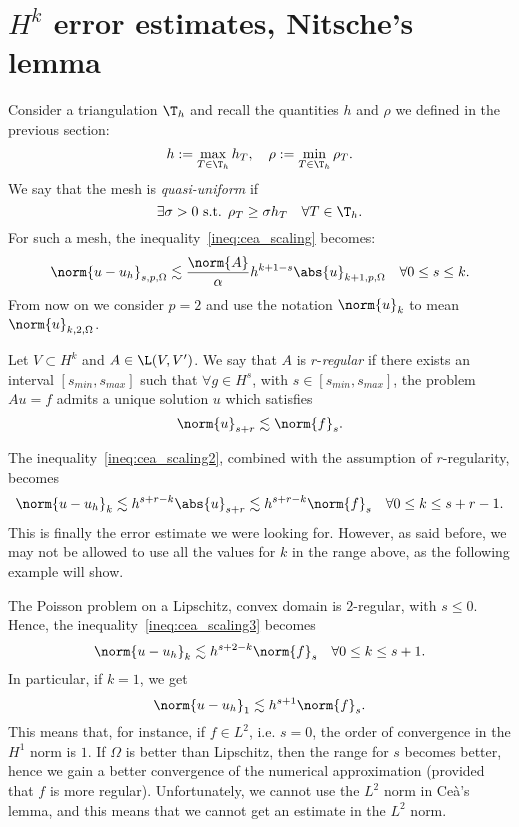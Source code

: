 \section{\texorpdfstring{$H^k$}{Hk} error estimates, Nitsche's lemma}
Consider a triangulation $\T_h$ and recall the quantities $h$ and $\rho$ we defined in the previous section:
\[
h := \max_{T \in \T_h} h_T, \quad \rho := \min_{T \in \T_h} \rho_T.
\]
We say that the mesh is \emph{quasi-uniform} if
\[
\exists \sigma > 0 \text{ s.t. } \rho_T \ge \sigma h_T  \quad \forall T\in \T_h.
\]
For such a mesh, the inequality~\eqref{ineq:cea_scaling} becomes:
\begin{equation} \label{ineq:cea_scaling2}
\norm{u - u_h}_{s,p,\Omega}
\lesssim \frac{\norm{A}}{\alpha} h^{k+1-s} \abs{u}_{k+1,p,\Omega} \quad \forall 0\le s \le k.
\end{equation}
From now on we consider $p=2$ and use the notation $\norm{u}_k$ to mean $\norm{u}_{k,2,\Omega}$.
\begin{definition}
Let $V \subset H^k$ and $A \in \L(V,V')$. We say that $A$ is $r$-\emph{regular} if there exists an interval $[s_{min}, s_{max}]$ such that $\forall g \in H^s$, with $s \in [s_{min}, s_{max}]$, the problem $Au=f$ admits a unique solution $u$ which satisfies
\[
\norm{u}_{s+r} \lesssim \norm{f}_s.
\]
\end{definition}
The inequality~\eqref{ineq:cea_scaling2}, combined with the assumption of $r$-regularity, becomes
\begin{equation}\label{ineq:cea_scaling3}
\norm{u-u_h}_k \lesssim h^{s+r-k} \abs{u}_{s+r} \lesssim h^{s+r-k} \norm{f}_s \quad \forall 0\le k \le s+r-1.
\end{equation}
This is finally the error estimate we were looking for. However, as said before, we may not be allowed to use all the values for $k$ in the range above, as the following example will show.
\begin{example}
The Poisson problem on a Lipschitz, convex domain is $2$-regular, with $s \le 0$. Hence, the inequality~\eqref{ineq:cea_scaling3} becomes
\[
\norm{u-u_h}_k \lesssim h^{s+2-k} \norm{f}_s \quad \forall 0\le k \le s+1.
\]
In particular, if $k=1$, we get
\[
\norm{u-u_h}_1 \lesssim h^{s+1} \norm{f}_s.
\]
This means that, for instance, if $f \in L^2$, i.e. $s=0$, the order of convergence in the $H^1$ norm is $1$. If $\Omega$ is better than Lipschitz, then the range for $s$ becomes better, hence we gain a better convergence of the numerical approximation (provided that $f$ is more regular).
Unfortunately, we cannot use the $L^2$ norm in Ceà's lemma, and this means that we cannot get an estimate in the $L^2$ norm.
\end{example}


